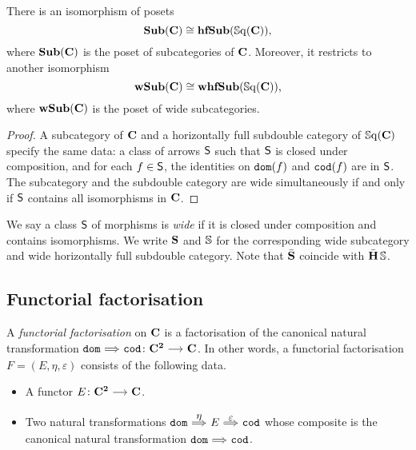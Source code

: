 \documentclass[a4paper,dvipsnames, 11pt]{amsart} %
\begin{document}
\begin{proposition}
	There is an isomorphism of posets
	\[
		\operatorname{\mathbf{Sub}}(\mathbf{C})\cong\operatorname{\mathbf{hfSub}}(\operatorname{\mathbb{S}\mathrm{q}}(\mathbf{C}))
		\text{,}
	\]
	where $\operatorname{\mathbf{Sub}}(\mathbf{C})$ is the poset of subcategories of $\mathbf{C}$.
	Moreover, it restricts to another isomorphism
	\[
		\operatorname{\mathbf{wSub}}(\mathbf{C})\cong\operatorname{\mathbf{whfSub}}(\operatorname{\mathbb{S}\mathrm{q}}(\mathbf{C}))
		\text{,}
	\]
	where $\operatorname{\mathbf{wSub}}(\mathbf{C})$ is the poset of wide subcategories.
\end{proposition}
\begin{proof}
	A subcategory of $\mathbf{C}$ and a horizontally full subdouble category of $\operatorname{\mathbb{S}\mathrm{q}}(\mathbf{C})$
	specify the same data:
	a class of arrows $\mathsf{S}$ such that $\mathsf{S}$ is closed under composition, and
	for each $f\in\mathsf{S}$, the identities on $\mathtt{dom}(f)$ and $\mathtt{cod}(f)$ are in $\mathsf{S}$.
	The subcategory and the subdouble category are wide simultaneously
	if and only if $\mathsf{S}$ contains all isomorphisms in $\mathbf{C}$.
\end{proof}
\begin{notation}
	We say a class $\mathsf{S}$ of morphisms is \emph{wide} if it is closed under composition and contains isomorphisms.
	We write $\mathbf{S}$ and $\mathbb{S}$ for the corresponding wide subcategory and wide horizontally full subdouble category.
	Note that $\bar{\mathbf{S}}$ coincide with $\operatorname{\bar{\mathbf{H}}}\mathbb{S}$.
\end{notation}

\subsection{Functorial factorisation}
\begin{definition}
	A \emph{functorial factorisation} on $\mathbf{C}$
	is a factorisation of the canonical natural transformation
	$\dom\arr[Rightarrow]\cod\colon\one{C}^\ra\arr\one{C}$.
	In other words, a functorial factorisation $F=(E,\eta,\varepsilon)$
	consists of the following data.
	\begin{itemize}
		\item %
			A functor $E\colon\one{C}^\ra\arr\one{C}$.
		\item %
			Two natural transformations
			$\dom\arr"\eta"[Rightarrow] E\arr"\varepsilon"[Rightarrow]\cod$
			whose composite is the canonical natural transformation $\dom\arr[Rightarrow]\cod$.
		\qedhere %
	\end{itemize}
\end{definition}



\end{document}

